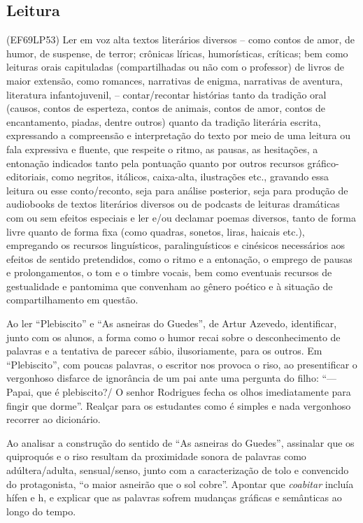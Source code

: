 \subsection{Leitura}

(EF69LP53) Ler em voz alta textos literários diversos – como contos de amor, de humor, de suspense, de terror; crônicas líricas, humorísticas, críticas; bem como leituras orais capituladas (compartilhadas ou não com o professor) de livros de maior extensão, como romances, narrativas de enigma, narrativas de aventura, literatura infantojuvenil, – contar/recontar histórias tanto da tradição oral (causos, contos de esperteza, contos de animais, contos de amor, contos de encantamento, piadas, dentre outros) quanto da tradição literária escrita, expressando a compreensão e interpretação do texto por meio de uma leitura ou fala expressiva e fluente, que respeite o ritmo, as pausas, as hesitações, a entonação indicados tanto pela pontuação quanto por outros recursos gráfico-editoriais, como negritos, itálicos, caixa-alta, ilustrações etc., gravando essa leitura ou esse conto/reconto, seja para análise posterior, seja para produção de audiobooks de textos literários diversos ou de podcasts de leituras dramáticas com ou sem efeitos especiais e ler e/ou declamar poemas diversos, tanto de forma livre quanto de forma fixa (como quadras, sonetos, liras, haicais etc.), empregando os recursos linguísticos, paralinguísticos e cinésicos necessários aos efeitos de sentido pretendidos, como o ritmo e a entonação, o emprego de pausas e prolongamentos, o tom e o timbre vocais, bem como eventuais recursos de gestualidade e pantomima que convenham ao gênero poético e à situação de compartilhamento em questão.

Ao ler ``Plebiscito'' e ``As asneiras do Guedes'', de Artur Azevedo,
identificar, junto com os alunos, a forma como o humor recai sobre o
desconhecimento de palavras e a tentativa de parecer sábio,
ilusoriamente, para os outros. Em ``Plebiscito'', com poucas palavras, o
escritor nos provoca o riso, ao presentificar o vergonhoso disfarce de
ignorância de um pai ante uma pergunta do filho: ``--- Papai, que é
plebiscito?/ O senhor Rodrigues fecha os olhos imediatamente para fingir
que dorme''. Realçar para os estudantes como é simples e nada vergonhoso
recorrer ao dicionário.

Ao analisar a construção do sentido de ``As asneiras do Guedes'',
assinalar que os quiproquós e o riso resultam da proximidade sonora de
palavras como adúltera/adulta, sensual/senso, junto com a caracterização
de tolo e convencido do protagonista, ``o maior asneirão que o sol
cobre''. Apontar que \emph{coabitar} incluía hífen e h, e explicar que
as palavras sofrem mudanças gráficas e semânticas ao longo do tempo.

